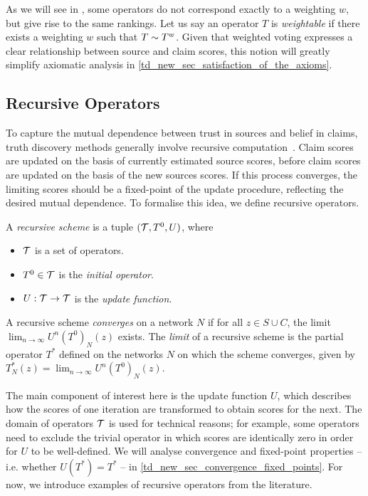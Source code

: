 As we will see in , some operators do not correspond
exactly to a weighting $w$, but give rise to the same rankings. Let us say an
operator $T$ is \emph{weightable} if there exists a weighting $w$ such that $T
\sim T^{w}$. Given that weighted voting expresses a clear
relationship between source and claim scores, this notion will greatly simplify
axiomatic analysis in \cref{td_new_sec_satisfaction_of_the_axioms}. 

\subsection{Recursive Operators}

To capture the mutual dependence between trust in sources and belief in claims,
truth discovery methods generally involve recursive
computation~\cite{pasternack2010,yin2008,yang_probabilistic_2019,du2019,zhang2018,li2016,galland2010,zhi2015}.
Claim scores are updated on the basis of currently estimated source scores,
before claim scores are updated on the basis of the new sources scores. If this
process converges, the limiting scores should be a fixed-point of the update
procedure, reflecting the desired mutual dependence. To formalise this idea, we
define recursive operators.

\begin{definition}
    A \emph{recursive scheme} is a tuple $(\mathcal{T}, T^0, U)$, where
    \begin{itemize}
        \item $\mathcal{T}$ is a set of operators.
        \item $T^0 \in \mathcal{T}$ is the \emph{initial operator}.
        \item $U: \mathcal{T} \to \mathcal{T}$ is the \emph{update function}.
    \end{itemize}
    A recursive scheme \emph{converges} on a network $N$ if for all $z
    \in S \cup C$, the limit $\lim_{n \to \infty}{U^n(T^0)_N(z)}$ exists. The
    \emph{limit} of a recursive scheme is the partial operator $T^*$ defined on
    the networks $N$ on which the scheme converges, given by $T^*_N(z) =
    \lim_{n \to \infty}{U^n(T^0)_N(z)}$.
\end{definition}

The main component of interest here is the update function $U$, which describes
how the scores of one iteration are transformed to obtain scores for the next.
The domain of operators $\mathcal{T}$ is used for technical reasons; for example, some
operators need to exclude the trivial operator in which scores are identically
zero in order for $U$ to be well-defined. We will analyse convergence and
fixed-point properties -- i.e. whether $U(T^*) = T^*$ -- in
\cref{td_new_sec_convergence_fixed_points}. For now, we introduce examples of
recursive operators from the literature.

